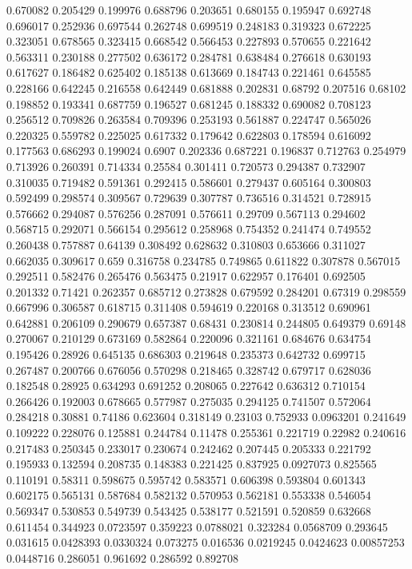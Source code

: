 0.670082 0.205429
0.199976 0.688796
0.203651 0.680155
0.195947 0.692748
0.696017 0.252936
0.697544 0.262748
0.699519 0.248183
0.319323 0.672225
0.323051 0.678565
0.323415 0.668542
0.566453 0.227893
0.570655 0.221642
0.563311 0.230188
0.277502 0.636172
0.284781 0.638484
0.276618 0.630193
0.617627 0.186482
0.625402 0.185138
0.613669 0.184743
0.221461 0.645585
0.228166 0.642245
0.216558 0.642449
0.681888 0.202831
0.68792 0.207516
0.68102 0.198852
0.193341 0.687759
0.196527 0.681245
0.188332 0.690082
0.708123 0.256512
0.709826 0.263584
0.709396 0.253193
0.561887 0.224747
0.565026 0.220325
0.559782 0.225025
0.617332 0.179642
0.622803 0.178594
0.616092 0.177563
0.686293 0.199024
0.6907 0.202336
0.687221 0.196837
0.712763 0.254979
0.713926 0.260391
0.714334 0.25584
0.301411 0.720573
0.294387 0.732907
0.310035 0.719482
0.591361 0.292415
0.586601 0.279437
0.605164 0.300803
0.592499 0.298574
0.309567 0.729639
0.307787 0.736516
0.314521 0.728915
0.576662 0.294087
0.576256 0.287091
0.576611 0.29709
0.567113 0.294602
0.568715 0.292071
0.566154 0.295612
0.258968 0.754352
0.241474 0.749552
0.260438 0.757887
0.64139 0.308492
0.628632 0.310803
0.653666 0.311027
0.662035 0.309617
0.659 0.316758
0.234785 0.749865
0.611822 0.307878
0.567015 0.292511
0.582476 0.265476
0.563475 0.21917
0.622957 0.176401
0.692505 0.201332
0.71421 0.262357
0.685712 0.273828
0.679592 0.284201
0.67319 0.298559
0.667996 0.306587
0.618715 0.311408
0.594619 0.220168
0.313512 0.690961
0.642881 0.206109
0.290679 0.657387
0.68431 0.230814
0.244805 0.649379
0.69148 0.270067
0.210129 0.673169
0.582864 0.220096
0.321161 0.684676
0.634754 0.195426
0.28926 0.645135
0.686303 0.219648
0.235373 0.642732
0.699715 0.267487
0.200766 0.676056
0.570298 0.218465
0.328742 0.679717
0.628036 0.182548
0.28925 0.634293
0.691252 0.208065
0.227642 0.636312
0.710154 0.266426
0.192003 0.678665
0.577987 0.275035
0.294125 0.741507
0.572064 0.284218
0.30881 0.74186
0.623604 0.318149
0.23103 0.752933
0.0963201 0.241649
0.109222 0.228076
0.125881 0.244784
0.11478 0.255361
0.221719 0.22982
0.240616 0.217483
0.250345 0.233017
0.230674 0.242462
0.207445 0.205333
0.221792 0.195933
0.132594 0.208735
0.148383 0.221425
0.837925 0.0927073
0.825565 0.110191
0.58311 0.598675
0.595742 0.583571
0.606398 0.593804
0.601343 0.602175
0.565131 0.587684
0.582132 0.570953
0.562181 0.553338
0.546054 0.569347
0.530853 0.549739
0.543425 0.538177
0.521591 0.520859
0.632668 0.611454
0.344923 0.0723597
0.359223 0.0788021
0.323284 0.0568709
0.293645 0.031615
0.0428393 0.0330324
0.073275 0.016536
0.0219245 0.0424623
0.00857253 0.0448716
0.286051 0.961692
0.286592 0.892708
